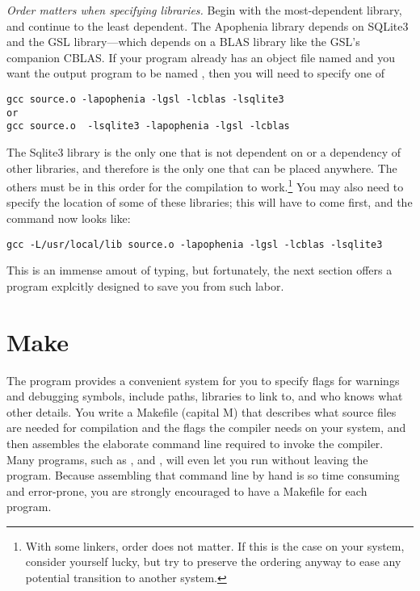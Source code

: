 {\em Order matters when specifying libraries.} Begin with the
most-dependent library, and continue to the least dependent.
The Apophenia library depends on SQLite3 and the GSL library---which
depends on a BLAS library like the GSL's companion CBLAS. If your
program already has an object file named  and you want the
output program to be named , then you will need to specify
one of 
\begin{lstlisting}
gcc source.o -lapophenia -lgsl -lcblas -lsqlite3
or
gcc source.o  -lsqlite3 -lapophenia -lgsl -lcblas
\end{lstlisting}
The Sqlite3 library is the only one that is not dependent on or a
dependency of other libraries, and therefore is the only one that can be
placed anywhere. The others must be in this order for the compilation to
work.\footnote{With some linkers, order does not matter. If this is the case on your system, consider yourself
lucky, but try to preserve the ordering anyway to ease any potential
transition to another system.} You may also need to specify the location of some of these
libraries; this will have to come first, and the command now looks like:
\begin{lstlisting}
gcc -L/usr/local/lib source.o -lapophenia -lgsl -lcblas -lsqlite3
\end{lstlisting}
This is an immense amout of typing, but fortunately, the next section
offers a
program explcitly designed to save you from such labor.



\section{Make} \label{make} 
The  program provides a convenient system for you to specify
flags for warnings and debugging symbols, include paths, libraries to
link to, and who knows what other details.  You write a Makefile (capital
M) that describes what source files are needed for compilation and the
flags the compiler needs on your system, and then  assembles the
elaborate command line required to invoke the compiler. Many programs,
such as ,  and , will even let you run
 without leaving the program.  Because assembling that command
line by hand is so time consuming and error-prone, you are strongly
encouraged to have a Makefile for each program.

